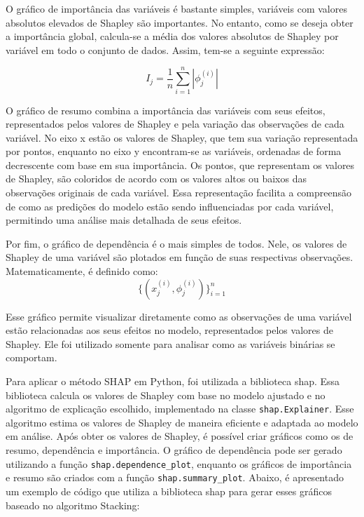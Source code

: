 \documentclass[
  12pt,
  a4paper,
]{scrreprt}
\begin{document}
\vspace{12pt}

O gráfico de importância das variáveis é bastante simples, variáveis com
valores absolutos elevados de Shapley são importantes. No entanto, como
se deseja obter a importância global, calcula-se a média dos valores
absolutos de Shapley por variável em todo o conjunto de dados. Assim,
tem-se a seguinte expressão:

\[
I_j = \frac{1}{n}\sum^{n}_{i = 1} |\phi_j^{\left(i\right)}|
\]

O gráfico de resumo combina a importância das variáveis com seus
efeitos, representados pelos valores de Shapley e pela variação das
observações de cada variável. No eixo x estão os valores de Shapley, que
tem sua variação representada por pontos, enquanto no eixo y
encontram-se as variáveis, ordenadas de forma decrescente com base em
sua importância. Os pontos, que representam os valores de Shapley, são
coloridos de acordo com os valores altos ou baixos das observações
originais de cada variável. Essa representação facilita a compreensão de
como as predições do modelo estão sendo influenciadas por cada variável,
permitindo uma análise mais detalhada de seus efeitos.

\vspace{12pt}

Por fim, o gráfico de dependência é o mais simples de todos. Nele, os
valores de Shapley de uma variável são plotados em função de suas
respectivas observações. Matematicamente, é definido como: \[
\{\left(x_j^{\left(i\right)}, \phi_j^{\left(i\right)} \right)\}^{n}_{i=1}
\]

Esse gráfico permite visualizar diretamente como as observações de uma
variável estão relacionadas aos seus efeitos no modelo, representados
pelos valores de Shapley. Ele foi utilizado somente para analisar como
as variáveis binárias se comportam.

\vspace{12pt}

Para aplicar o método SHAP em Python, foi utilizada a biblioteca shap.
Essa biblioteca calcula os valores de Shapley com base no modelo
ajustado e no algoritmo de explicação escolhido, implementado na classe
\texttt{shap.Explainer}. Esse algoritmo estima os valores de Shapley de
maneira eficiente e adaptada ao modelo em análise. Após obter os valores
de Shapley, é possível criar gráficos como os de resumo, dependência e
importância. O gráfico de dependência pode ser gerado utilizando a
função \texttt{shap.dependence\_plot}, enquanto os gráficos de
importância e resumo são criados com a função
\texttt{shap.summary\_plot}. Abaixo, é apresentado um exemplo de código
que utiliza a biblioteca shap para gerar esses gráficos baseado no
algoritmo Stacking:
\end{document}
